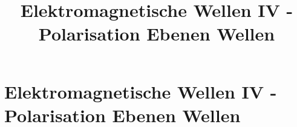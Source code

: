 
  
\title[TET: Elektromagnetische Wellen IV - Polarisation Ebenen Wellen]{Elektromagnetische Wellen IV - Polarisation Ebenen Wellen}


% 
% 

\maketitle

% 
% 
\section{Elektromagnetische Wellen IV - Polarisation Ebenen Wellen}


